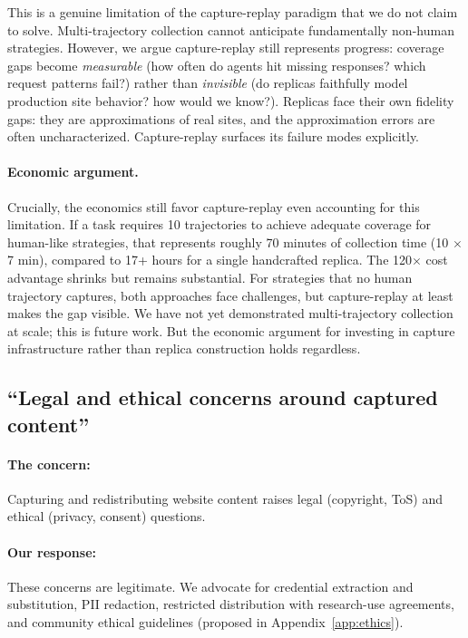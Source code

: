 \documentclass[letterpaper]{article}
\begin{document}
This is a genuine limitation of the capture-replay paradigm that we do not claim to solve. Multi-trajectory collection cannot anticipate fundamentally non-human strategies. However, we argue capture-replay still represents progress: coverage gaps become \emph{measurable} (how often do agents hit missing responses? which request patterns fail?) rather than \emph{invisible} (do replicas faithfully model production site behavior? how would we know?). Replicas face their own fidelity gaps: they are approximations of real sites, and the approximation errors are often uncharacterized. Capture-replay surfaces its failure modes explicitly.

\paragraph{Economic argument.} Crucially, the economics still favor capture-replay even accounting for this limitation. If a task requires 10 trajectories to achieve adequate coverage for human-like strategies, that represents roughly 70 minutes of collection time (10 $\times$ 7 min), compared to 17+ hours for a single handcrafted replica. The 120$\times$ cost advantage shrinks but remains substantial. For strategies that no human trajectory captures, both approaches face challenges, but capture-replay at least makes the gap visible. We have not yet demonstrated multi-trajectory collection at scale; this is future work. But the economic argument for investing in capture infrastructure rather than replica construction holds regardless.

\subsection{``Legal and ethical concerns around captured content''}

\paragraph{The concern:} Capturing and redistributing website content raises legal (copyright, ToS) and ethical (privacy, consent) questions.

\paragraph{Our response:} These concerns are legitimate. We advocate for credential extraction and substitution, PII redaction, restricted distribution with research-use agreements, and community ethical guidelines (proposed in Appendix~\ref{app:ethics}).
\end{document}
